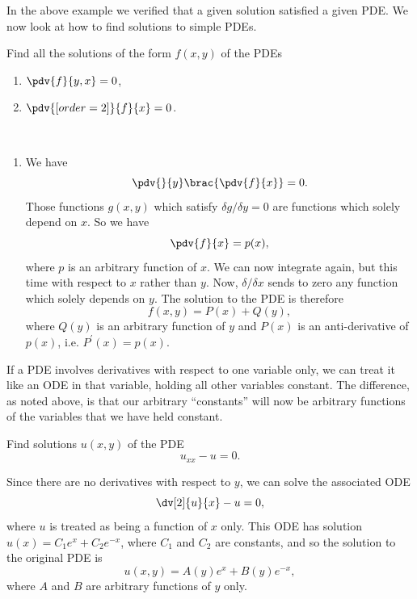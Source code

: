 In the above example we verified that a given solution satisfied a given PDE. We now look at how to find solutions to simple PDEs.

\begin{exercise}{}{}
Find all the solutions of the form $f(x,y)$ of the PDEs
\begin{enumerate}[label=(\alph*)]
\item $\pdv{f}{y,x}=0$,
\item $\pdv{[order={2}]}{f}{x}=0$.
\end{enumerate}
\end{exercise}

\begin{solution} \
\begin{enumerate}[label=(\alph*)]
\item We have
\[ \pdv{}{y}\brac{\pdv{f}{x}}=0. \]
Those functions $g(x,y)$  which satisfy $\delta g/\delta y=0$ are functions which solely depend on $x$. So we have
\[ \pdv{f}{x}=p(x), \]
where $p$ is an arbitrary function of $x$. We can now integrate again, but this time with respect to $x$ rather than $y$. Now, $\delta/\delta x$ sends to zero any function which solely depends on $y$. The solution to the PDE is therefore
\[ f(x,y)=P(x)+Q(y), \]
where $Q(y)$ is an arbitrary function of $y$ and $P(x)$ is an anti-derivative of $p(x)$, i.e. $P^\prime(x)=p(x)$.
\end{enumerate}
\end{solution}

If a PDE involves derivatives with respect to one variable only, we can treat it like an ODE in that variable, holding all other variables constant. The difference, as noted above, is that our arbitrary ``constants'' will now be arbitrary functions of the variables that we have held constant.

\begin{exercise}{}{}
Find solutions $u(x,y)$ of the PDE
\[ u_{xx}-u=0. \]
\end{exercise}

\begin{solution}
Since there are no derivatives with respect to $y$, we can solve the associated ODE
\[ \dv[2]{u}{x}-u=0, \]
where $u$ is treated as being a function of $x$ only. This ODE has solution $u(x)=C_1e^x+C_2e^{-x}$, where $C_1$ and $C_2$ are constants, and so the solution to the original PDE is
\[ u(x,y)=A(y)e^x+B(y)e^{-x}, \]
where $A$ and $B$ are arbitrary functions of $y$ only.
\end{solution}

